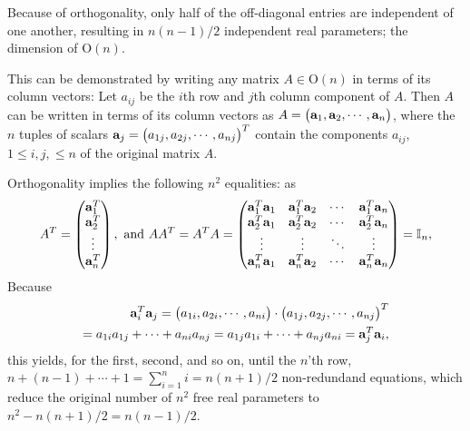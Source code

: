 
Because of orthogonality, only half of the off-diagonal entries are independent of one another,
resulting in $n(n-1)/2$ independent real parameters; the dimension of $ \textrm{O}(n)$.

{\color{OliveGreen}
\bproof
This can be demonstrated by writing any matrix $A \in \textrm{O}(n)$ in terms of its column vectors:
Let $a_{ij}$ be the $i$th row and $j$th column component of $A$.
Then $A$ can be written in terms of its column vectors as
$A=\begin{pmatrix}
{\bf a}_1,
{\bf a}_2,
\cdots ,
{\bf a}_n
\end{pmatrix}$,
where the $n$ tuples of scalars ${\bf a}_j = \begin{pmatrix}
{a}_{1j},
{a}_{2j},
\cdots ,
{a}_{nj}
\end{pmatrix}^T$
contain the components $a_{ij}$, $ 1 \le i,j, \le n$ of the original matrix  $A$.

Orthogonality implies the following $n^2$ equalities: as
\begin{equation}
A^T =\begin{pmatrix}
{\bf a}_1^T\\
{\bf a}_2^T\\
\vdots \\
{\bf a}_n^T
\end{pmatrix},
\text { and }
%
AA^T=A^T A=
\begin{pmatrix}
{\bf a}_1^T{\bf a}_1 & {\bf a}_1^T{\bf a}_2  &\cdots & {\bf a}_1^T{\bf a}_n  \\
{\bf a}_2^T{\bf a}_1 & {\bf a}_2^T{\bf a}_2  &\cdots & {\bf a}_2^T{\bf a}_n  \\
\vdots   & \vdots &\ddots & \vdots  \\
{\bf a}_n^T {\bf a}_1& {\bf a}_n^T{\bf a}_2  &\cdots & {\bf a}_n^T{\bf a}_n  \\
\end{pmatrix}
={\Bbb I}_n,
\end{equation}
Because
\begin{equation}
\begin{split}
{\bf a}_i^T{\bf a}_j =
\begin{pmatrix}
{a}_{1i},
{a}_{2i},
\cdots ,
{a}_{ni}
\end{pmatrix}
\cdot
\begin{pmatrix}
{a}_{1j},
{a}_{2j},
\cdots ,
{a}_{nj}
\end{pmatrix}^T
\\
=
{a}_{1i}  {a}_{1j} +
\cdots +
{a}_{ni}  {a}_{nj}
=
{a}_{1j} {a}_{1i}  +
\cdots +
 {a}_{nj} {a}_{ni} =
{\bf a}_j^T{\bf a}_i,
\end{split}
\end{equation}
this yields, for the first, second, and so on, until the $n$'th row,
$n + (n-1) +  \cdots +1= \sum_{i=1}^{n} i= n(n+1)/2$ non-redundand equations, which reduce the original number of $n^2$ free real parameters to
$n^2 - n(n+1)/2 = n(n-1)/2$.
\eproof
}

